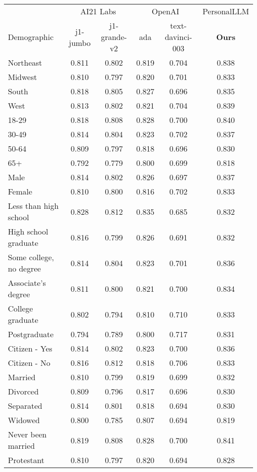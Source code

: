 \begin{table}[!ht]
    \centering
    \begin{tabular}{lccccc}
    \toprule
     & \multicolumn{2}{c}{AI21 Labs} & \multicolumn{2}{c}{OpenAI} & \textsf{PersonalLLM} \\
    Demographic & j1-jumbo & j1-grande-v2 & ada & text-davinci-003 & \textbf{Ours} \\
    \midrule
Northeast & 0.811 & 0.802 & 0.819 & 0.704 & 0.838 \\
Midwest & 0.810 & 0.797 & 0.820 & 0.701 & 0.833 \\
South & 0.818 & 0.805 & 0.827 & 0.696 & 0.835 \\
West & 0.813 & 0.802 & 0.821 & 0.704 & 0.839 \\
18-29 & 0.818 & 0.808 & 0.828 & 0.700 & 0.840 \\
30-49 & 0.814 & 0.804 & 0.823 & 0.702 & 0.837 \\
50-64 & 0.809 & 0.797 & 0.818 & 0.696 & 0.830 \\
65+ & 0.792 & 0.779 & 0.800 & 0.699 & 0.818 \\
Male & 0.814 & 0.802 & 0.826 & 0.697 & 0.837 \\
Female & 0.810 & 0.800 & 0.816 & 0.702 & 0.833 \\
Less than high school & 0.828 & 0.812 & 0.835 & 0.685 & 0.832 \\
High school graduate & 0.816 & 0.799 & 0.826 & 0.691 & 0.832 \\
Some college, no degree & 0.814 & 0.804 & 0.823 & 0.701 & 0.836 \\
Associate's degree & 0.811 & 0.800 & 0.821 & 0.700 & 0.834 \\
College graduate & 0.802 & 0.794 & 0.810 & 0.710 & 0.833 \\
Postgraduate & 0.794 & 0.789 & 0.800 & 0.717 & 0.831 \\
Citizen - Yes & 0.814 & 0.802 & 0.823 & 0.700 & 0.836 \\
Citizen - No & 0.816 & 0.812 & 0.818 & 0.706 & 0.833 \\
Married & 0.810 & 0.799 & 0.819 & 0.699 & 0.832 \\
Divorced & 0.809 & 0.796 & 0.817 & 0.696 & 0.830 \\
Separated & 0.814 & 0.801 & 0.818 & 0.694 & 0.830 \\
Widowed & 0.800 & 0.785 & 0.807 & 0.694 & 0.819 \\
Never been married & 0.819 & 0.808 & 0.828 & 0.700 & 0.841 \\
Protestant & 0.810 & 0.797 & 0.820 & 0.694 & 0.828 \\

\end{tabular}
\end{table}
